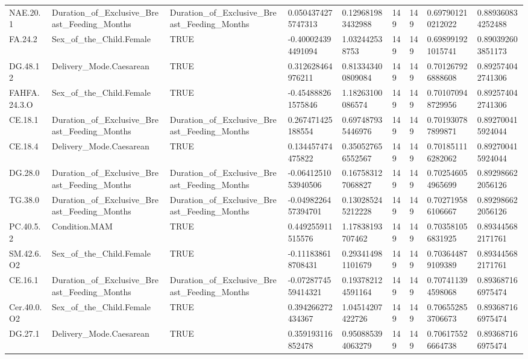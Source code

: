 \begin{longtable}{lllllllll}
NAE.20.1 & Duration\_of\_Exclusive\_Breast\_Feeding\_Months & Duration\_of\_Exclusive\_Breast\_Feeding\_Months & 0.0504374275747313 & 0.129681983432988 & 149 & 149 & 0.697901210212022 & 0.889360834252488 \\
FA.24.2 & Sex\_of\_the\_Child.Female & TRUE & -0.400024394491094 & 1.032442538753 & 149 & 149 & 0.698991921015741 & 0.890392603851173 \\
DG.48.12 & Delivery\_Mode.Caesarean & TRUE & 0.312628464976211 & 0.813343400809084 & 149 & 149 & 0.701267926888608 & 0.892574042741306 \\
FAHFA.24.3.O & Sex\_of\_the\_Child.Female & TRUE & -0.454888261575846 & 1.18263100086574 & 149 & 149 & 0.701070948729956 & 0.892574042741306 \\
CE.18.1 & Duration\_of\_Exclusive\_Breast\_Feeding\_Months & Duration\_of\_Exclusive\_Breast\_Feeding\_Months & 0.267471425188554 & 0.697487935446976 & 149 & 149 & 0.701930787899871 & 0.892700415924044 \\
CE.18.4 & Delivery\_Mode.Caesarean & TRUE & 0.134457474475822 & 0.350527656552567 & 149 & 149 & 0.701851116282062 & 0.892700415924044 \\
DG.28.0 & Duration\_of\_Exclusive\_Breast\_Feeding\_Months & Duration\_of\_Exclusive\_Breast\_Feeding\_Months & -0.0641251053940506 & 0.167583127068827 & 149 & 149 & 0.702546054965699 & 0.892986622056126 \\
TG.38.0 & Duration\_of\_Exclusive\_Breast\_Feeding\_Months & Duration\_of\_Exclusive\_Breast\_Feeding\_Months & -0.0498226457394701 & 0.130285245212228 & 149 & 149 & 0.702719586106667 & 0.892986622056126 \\
PC.40.5.2 & Condition.MAM & TRUE & 0.449255911515576 & 1.17838193707462 & 149 & 149 & 0.703581056831925 & 0.893445682171761 \\
SM.42.6.O2 & Sex\_of\_the\_Child.Female & TRUE & -0.111838618708431 & 0.293414981101679 & 149 & 149 & 0.703644879109389 & 0.893445682171761 \\
CE.16.1 & Duration\_of\_Exclusive\_Breast\_Feeding\_Months & Duration\_of\_Exclusive\_Breast\_Feeding\_Months & -0.0728774559414321 & 0.193782124591164 & 149 & 149 & 0.707411394598068 & 0.893687166975474 \\
Cer.40.0.O2 & Sex\_of\_the\_Child.Female & TRUE & 0.394266272434367 & 1.04514207422726 & 149 & 149 & 0.706552853706673 & 0.893687166975474 \\
DG.27.1 & Delivery\_Mode.Caesarean & TRUE & 0.359193116852478 & 0.950885394063279 & 149 & 149 & 0.706175526664738 & 0.893687166975474 \\

\end{longtable}
